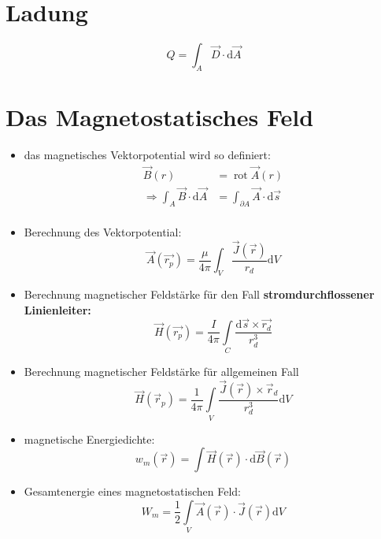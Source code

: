 \documentclass[nochapterpage,bigchapter,linedtoc,longdoc,colorback,accentcolor=tud2c]{tudreport}
\DeclareMathOperator{\Rot}{\mathrm{rot }}
\begin{document}
\section{Ladung}
\begin{equation*}
	Q = \int_A \vec{D}\cdot \mathrm{d}\vec{A}
\end{equation*}
\section{Das Magnetostatisches Feld}
\begin{itemize}
	\item das magnetisches Vektorpotential wird so definiert:
		\begin{equation*}
			\begin{aligned}
				\vec{B}(r) &= \Rot\vec{A}(r) \\
				\Rightarrow \int_A \vec{B}\cdot \mathrm{d}\vec{A} &= \int_{\partial A} \vec{A} \cdot \mathrm{d}\vec{s} \\
			\end{aligned}
		\end{equation*}
	\item Berechnung des Vektorpotential:
		\begin{equation*}
			\vec{A}(\vec{r_p}) = \frac{\mu }{4 \pi}\int_V \frac{\vec{J}(\vec{r})}{r_d}\mathrm{d}V
		\end{equation*}
	\item Berechnung magnetischer Feldstärke für den Fall \textbf{stromdurchflossener Linienleiter:}
		\begin{equation*}
			\vec{H}(\vec{r_p}) = \frac{I}{4 \pi}\int\limits_C \frac{\mathrm{d}\vec{s} \times \vec{r_d}}{r_d^3}
		\end{equation*}
	\item Berechnung magnetischer Feldstärke für allgemeinen Fall
		\begin{equation*}
			\vec{H}(\vec{r}_p) = \frac{1}{4 \pi} \int \limits_V \frac{\vec{J}(\vec{r}) \times \vec{r}_d}{r_d^3} \mathrm{d}V
		\end{equation*}
	\item magnetische Energiedichte:
		\begin{equation*}
			w_m(\vec{r})= \int\vec{H}(\vec{r}) \cdot \mathrm{d}\vec{B}(\vec{r})
		\end{equation*}
	\item Gesamtenergie eines magnetostatischen Feld:
		\begin{equation*}
			W_m = \frac{1}{2}\int\limits_V \vec{A}(\vec{r})\cdot \vec{J}(\vec{r})\mathrm{d}V
		\end{equation*}
\end{itemize}
\end{document}
